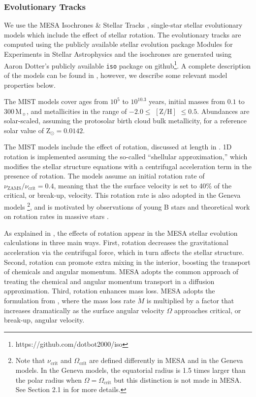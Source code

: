 \documentclass[preprint2]{aastex61}
\newcommand\Msun{\ensuremath{\mathrm{M_{\sun}}}\xspace}
\begin{document}
\subsubsection{Evolutionary Tracks}

We use the MESA Isochrones \& Stellar Tracks \citep[MIST;][]{Dotter+2016, Choi+2016}, single-star stellar evolutionary models which include the effect of stellar rotation. The evolutionary tracks are computed using the publicly available stellar evolution package Modules for Experiments in Stellar Astrophysics \citep[MESA v7503;][]{Paxton+2011,Paxton+2013, Paxton+2015} and the isochrones are generated using Aaron Dotter's publicly available \texttt{iso} package on github\footnote{https://github.com/dotbot2000/iso}. A complete description of the models can be found in \citet{Choi+2016}, however, we describe some relevant model properties below. 

The MIST models cover ages from $10^5$ to $10^{10.3}$ years, initial masses from $0.1$ to $300\,$\Msun, and metallicities in the range of $-2.0 \leq$ $[\mathrm{Z}/\mathrm{H}]$ $\leq 0.5$. Abundances are solar-scaled, assuming the \citet{Asplund+2009} protosolar birth cloud bulk metallicity, for a reference solar value of $\mathrm{Z}_{\odot} = 0.0142$.

The MIST models include the effect of rotation, discussed at length in \citet{Choi+2017}. 1D rotation is implemented assuming the so-called ``shellular approximation,'' which modifies the stellar structure equations with a centrifugal acceleration term in the presence of rotation. The models assume an initial rotation rate of  $\nu_{\mathrm{ZAMS}}/\nu_{\mathrm{crit}} = 0.4$, meaning that the the surface velocity is set to 40\% of the critical, or break-up, velocity. This rotation rate is also adopted in the Geneva models \citep{Ekstrom+2012}\footnote{Note that $\nu_{\mathrm{crit}}$ and $\Omega_{\mathrm{crit}}$ are defined differently in MESA and in the Geneva models. In the Geneva models, the equatorial radius is 1.5 times larger than the polar radius when $\Omega = \Omega_{\mathrm{crit}}$ but this distinction is not made in MESA. See Section 2.1 in \citet{Georgy+2013} for more details.}, and is motivated by observations of young B stars \citep{Huang+2010} and theoretical work on rotation rates in massive stars \citep{Rosen+2012}.

As explained in \citet{Choi+2017}, the effects of rotation appear in the MESA stellar evolution calculations in three main ways. First, rotation decreases the gravitational acceleration via the centrifugal force, which in turn affects the stellar structure. Second, rotation can promote extra mixing in the interior, boosting the transport of chemicals and angular momentum. MESA adopts the common approach of treating the chemical and angular momentum transport in a diffusion approximation. Third, rotation enhances mass loss. MESA adopts the formulation from \citet{Langer+1998}, where the mass loss rate $\dot{M}$ is multiplied by a factor that increases dramatically as the surface angular velocity $\Omega$ approaches critical, or break-up, angular velocity. 
\end{document}
